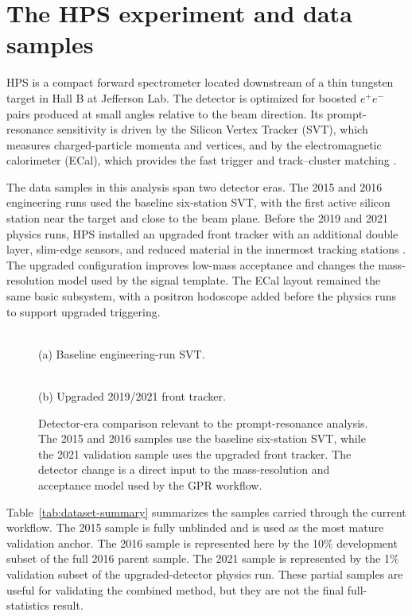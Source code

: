 \section{The HPS experiment and data samples}
\label{sec:detector-data}

HPS is a compact forward spectrometer located downstream of a thin tungsten target in
Hall B at Jefferson Lab. The detector is optimized for boosted $e^+e^-$ pairs produced
at small angles relative to the beam direction. Its prompt-resonance sensitivity is
driven by the Silicon Vertex Tracker (SVT), which measures charged-particle momenta and
vertices, and by the electromagnetic calorimeter (ECal), which provides the fast
trigger and track--cluster matching \cite{HPSExperiment2022,HPS2016PromptLong}.

The data samples in this analysis span two detector eras. The 2015 and 2016
engineering runs used the baseline six-station SVT, with the first active silicon
station near the target and close to the beam plane. Before the 2019 and 2021 physics
runs, HPS installed an upgraded front tracker with an additional double layer,
slim-edge sensors, and reduced material in the innermost tracking stations
\cite{HPSExperiment2022,HPSSlimEdgeSensors2020}. The upgraded configuration improves
low-mass acceptance and changes the mass-resolution model used by the signal template.
The ECal layout remained the same basic subsystem, with a positron hodoscope added
before the physics runs to support upgraded triggering.

\begin{figure}[t]
\centering
\begin{minipage}{0.48\textwidth}
\centering
{}\\
(a) Baseline engineering-run SVT.
\end{minipage}
\hfill
\begin{minipage}{0.48\textwidth}
\centering
{}\\
(b) Upgraded 2019/2021 front tracker.
\end{minipage}
\caption{Detector-era comparison relevant to the prompt-resonance analysis. The 2015
and 2016 samples use the baseline six-station SVT, while the 2021 validation sample
uses the upgraded front tracker. The detector change is a direct input to the
mass-resolution and acceptance model used by the GPR workflow.}
\label{fig:svt-eras}
\end{figure}

Table~\ref{tab:dataset-summary} summarizes the samples carried through the current
workflow. The 2015 sample is fully unblinded and is used as the most mature validation
anchor. The 2016 sample is represented here by the 10\% development subset of the
full 2016 parent sample. The 2021 sample is represented by the 1\% validation subset
of the upgraded-detector physics run. These partial samples are useful for validating
the combined method, but they are not the final full-statistics result.

